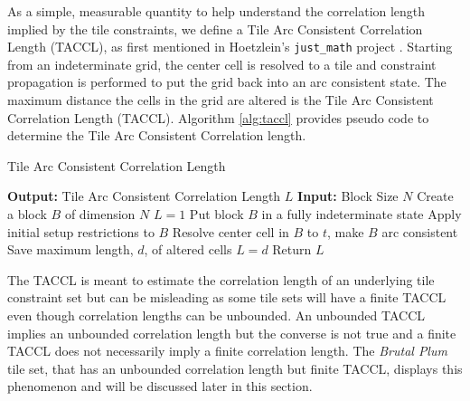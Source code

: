 As a simple, measurable quantity to help understand the correlation length implied by the tile constraints, we define a Tile Arc Consistent Correlation
Length (TACCL), as first mentioned in Hoetzlein's \texttt{just\_math} project \cite{Hoetzlein_2023}.
Starting from an indeterminate grid, the center cell is resolved to a tile and constraint propagation is performed to put the grid
back into an arc consistent state.
The maximum distance the cells in the grid are altered is the Tile Arc Consistent Correlation Length (TACCL).
Algorithm \ref{alg:taccl} provides pseudo code to determine the Tile Arc Consistent Correlation length.

\begin{algorithm}
  \caption{Tile Arc Consistent Correlation Length}
  \label{alg:taccl}
  \begin{algorithmic}
    \State \textbf{Output:} Tile Arc Consistent Correlation Length $L$
    \State \textbf{Input:} Block Size $N$
    \State Create a block $B$ of dimension $N$
    \State $L=1$
      \State Put block $B$ in a fully indeterminate state
      \State Apply initial setup restrictions to $B$
      \State Resolve center cell in $B$ to $t$, make $B$ arc consistent
      \State Save maximum length, $d$, of altered cells
        \State $L = d$
      \EndIf
    \EndFor
    \State Return $L$
  \end{algorithmic}
\end{algorithm}


The TACCL is meant to estimate the correlation length of an underlying tile constraint set but can be misleading as some
tile sets will have a finite TACCL even though correlation lengths can be unbounded.
An unbounded TACCL implies an unbounded correlation length but the converse is not true and a finite TACCL
does not necessarily imply a finite correlation length.
The \textit{Brutal Plum} tile set, that has an unbounded correlation length but finite TACCL,
displays this phenomenon and will be discussed later in this section.


%
\newcommand{\specialcell}[2][c]{\begin{tabular}[#1]{@{}l@{}}#2\end{tabular}}
\newcommand{\specialcellCenter}[2][c]{\begin{tabular}[#1]{@{}c@{}}#2\end{tabular}}

